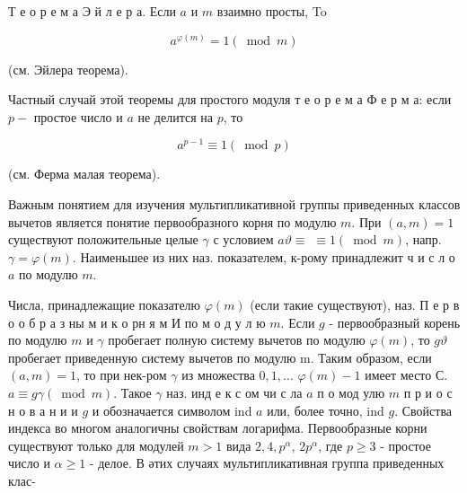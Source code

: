\documentclass[10pt]{article}
\begin{document}
Т е о р е м а Э й л е р а. Если $a$ и $m$ взаимно просты, To



\[

a^{\varphi(m)}=1(\bmod m)

\]



(см. Эйлера теорема).



Частный случай этой теоремы для простого модуля т е о р е м а Ф е р м а: если $p-$ простое число и $a$ не делится на $p$, то



\[

a^{p-1} \equiv 1(\bmod p)

\]



(см. Ферма малая теорема).



Важным понятием для изучения мультипликативной группы приведенных классов вычетов является понятие первообразного корня по модулю $m$. При $(a, m)=1$ существуют положительные целые $\gamma$ с условием $a \vartheta \equiv$ $\equiv 1(\bmod m)$, напр. $\gamma=\varphi(m)$. Наименьшее из них наз. показателем, к-рому принадлежит ч и с л о $a$ по модулю $m$.



Числа, принадлежащие показателю $\varphi(m)$ (если такие существуют), наз. П е р в о о б р а з ны м и к о рн я м И по м о д у л ю $m$. Если $g$ - первообразный корень по модулю $m$ и $\gamma$ пробегает полную систему вычетов по модулю $\varphi(m)$, то $g \vartheta$ пробегает приведенную систему вычетов по модулю $\mathrm{m}$. Таким образом, если $(a, m)=1$, то при нек-ром $\gamma$ из множества $0,1, \ldots$ $\varphi(m)-1$ имеет место С. $a \equiv g \gamma(\bmod m)$. Такое $\gamma$ наз. инд е к с ом чи с ла $a$ п о мод улю $m$ п р и о с н о в а н и и $g$ и обозначается символом ind $a$ или, более точно, ind $g$. Свойства индекса во многом аналогичны свойствам логарифма. Первообразные корни существуют только для модулей $m>1$ вида $2,4, p^{\alpha}$, $2 p^{\alpha}$, где $p \geqslant 3$ - простое число и $\alpha \geqslant 1$ - делое. В әтих случаях мультипликативная группа приведенных клас-
\end{document}
